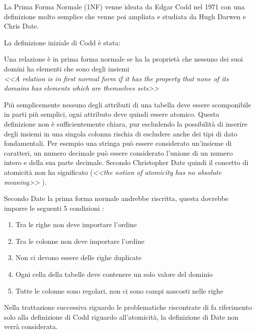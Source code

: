 La Prima Forma Normale (1NF) venne ideata da Edgar Codd nel 1971 con una definizione molto semplice che venne poi ampliata e studiata da Hugh Darwen e Chris Date.

La definizione iniziale di Codd è stata:

\begin{framed}
	Una relazione è in prima forma normale se ha la proprietà che nessuno dei suoi domini ha elementi che sono degli insiemi \\	
	
	\emph{<<A relation is in first normal form if it has the property that none of its domains has elements which are themselves sets>>} \cite{codd:relationalmodel}
\end{framed}

Più semplicemente nessuno degli attributi di una tabella deve essere scomponibile in parti più semplici, ogni attributo deve quindi essere atomico. Questa definizione non è sufficientemente chiara, pur escludendo la possibilità di inserire degli insiemi in una singola colonna rischia di escludere anche dei tipi di dato fondamentali. Per esempio una stringa può essere considerato un'insieme di caratteri, un numero decimale può essere considerato l'unione di un numero intero e della sua parte decimale. Secondo Christopher Date quindi il concetto di atomicità non ha significato (\emph{<<the notion of atomicity has no absolute meaning>>} \cite[p.~112]{date:dateondatabase}).

Secondo Date la prima forma normale andrebbe riscritta, questa dovrebbe imporre le seguenti 5 condizioni \cite[p.~127-128]{date:dateondatabase}:

\begin{framed}
	\begin{enumerate}
		\item Tra le righe non deve importare l'ordine
		\item Tra le colonne non deve importare l'ordine
		\item Non ci devono essere delle righe duplicate
		\item Ogni cella della tabelle deve contenere un solo valore del dominio
		\item Tutte le colonne sono regolari, non ci sono campi nascosti nelle righe
	\end{enumerate}
\end{framed}

Nella trattazione successiva riguardo le problematiche riscontrate di fa riferimento solo alla definizione di Codd riguardo all'atomicità, la definizione di Date non verrà considerata.

